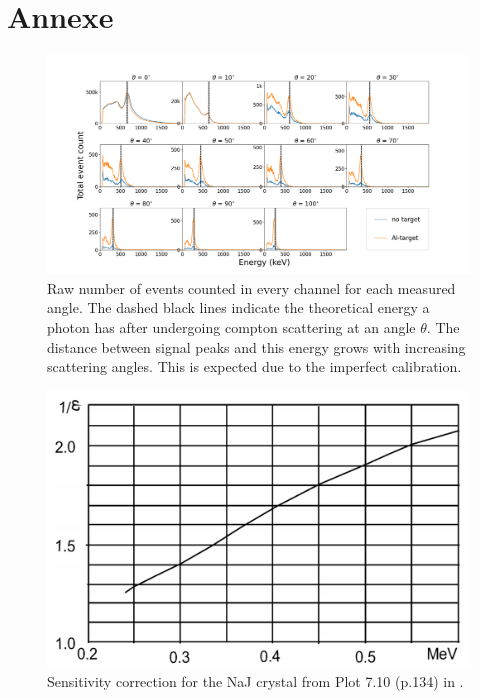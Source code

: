
\section{Annexe}
\label{sec:annexe}


\begin{figure}
  \includegraphics[width=1.0\textwidth]{./fig/differential measurements.png}
\caption{Raw number of events counted in every channel for each measured angle.
  The dashed black lines indicate the theoretical energy a photon has after
  undergoing compton scattering at an angle $\theta$. The distance between signal
  peaks and this energy grows with increasing scattering angles. This is expected
  due to the imperfect calibration.}\label{fig:diff-measurements2}
\end{figure}

\begin{figure}
  \includegraphics[width=1.0\textwidth]{./fig/plot710.png}
\caption{Sensitivity correction for the NaJ crystal from Plot 7.10 (p.134) in \cite{Sch17}.}\label{fig:plot710}
\end{figure}